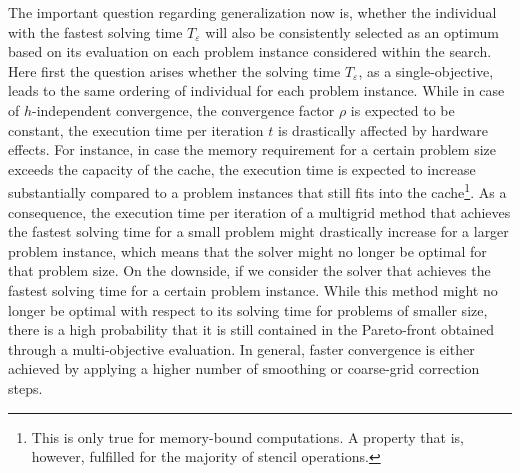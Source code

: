 The important question regarding generalization now is, whether the individual with the fastest solving time $T_{\varepsilon}$ will also be consistently selected as an optimum based on its evaluation on each problem instance considered within the search.
Here first the question arises whether the solving time $T_{\varepsilon}$, as a single-objective, leads to the same ordering of individual for each problem instance.
While in case of $h$-independent convergence, the convergence factor $\rho$ is expected to be constant, the execution time per iteration $t$ is drastically affected by hardware effects.
For instance, in case the memory requirement for a certain problem size exceeds the capacity of the cache, the execution time is expected to increase substantially compared to a problem instances that still fits into the cache\footnote{This is only true for memory-bound computations. A property that is, however, fulfilled for the majority of stencil operations.}.
As a consequence, the execution time per iteration of a multigrid method that achieves the fastest solving time for a small problem might drastically increase for a larger problem instance, which means that the solver might no longer be optimal for that problem size.
On the downside, if we consider the solver that achieves the fastest solving time for a certain problem instance.
While this method might no longer be optimal with respect to its solving time for problems of smaller size, there is a high probability that it is still contained in the Pareto-front obtained through a multi-objective evaluation.
In general, faster convergence is either achieved by applying a higher number of smoothing or coarse-grid correction steps.

